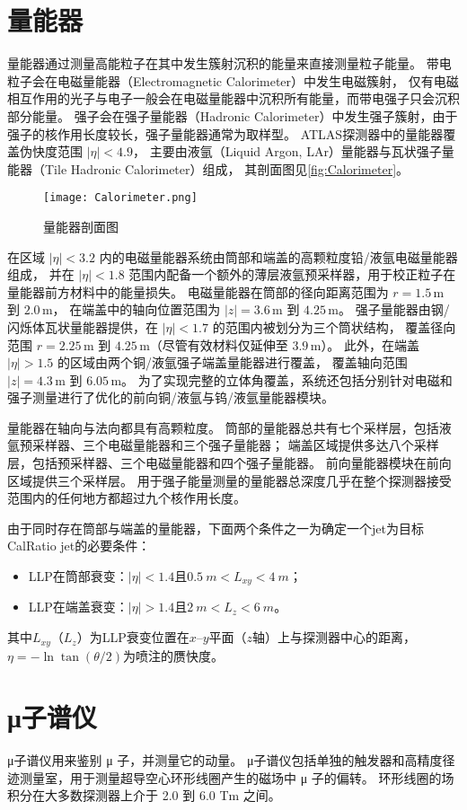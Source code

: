 \section{量能器}
量能器通过测量高能粒子在其中发生簇射沉积的能量来直接测量粒子能量。
带电粒子会在电磁量能器（Electromagnetic Calorimeter）中发生电磁簇射，
仅有电磁相互作用的光子与电子一般会在电磁量能器中沉积所有能量，而带电强子只会沉积部分能量。
强子会在强子量能器（Hadronic Calorimeter）中发生强子簇射，由于强子的核作用长度较长，强子量能器通常为取样型。
ATLAS探测器中的量能器覆盖伪快度范围 \( |\eta| < 4.9 \)，
主要由液氩（Liquid Argon, LAr）量能器与瓦状强子量能器（Tile Hadronic Calorimeter）组成，
其剖面图见\autoref{fig:Calorimeter}。

\begin{figure}[ht]
    \centering
    \texttt{[image: Calorimeter.png]}
    \caption{量能器剖面图}
    \label{fig:Calorimeter}
\end{figure}

在区域 \( |\eta| < 3.2 \) 内的电磁量能器系统由筒部和端盖的高颗粒度铅/液氩电磁量能器组成，
并在 \( |\eta| < 1.8 \) 范围内配备一个额外的薄层液氩预采样器，用于校正粒子在量能器前方材料中的能量损失。
电磁量能器在筒部的径向距离范围为 \( r = 1.5\,\text{m} \) 到 \( 2.0\,\text{m} \)，
在端盖中的轴向位置范围为 \( |z| = 3.6\,\text{m} \) 到 \( 4.25\,\text{m} \)。
强子量能器由钢/闪烁体瓦状量能器提供，在 \( |\eta| < 1.7 \) 的范围内被划分为三个筒状结构，
覆盖径向范围 \( r = 2.25\,\text{m} \) 到 \( 4.25\,\text{m} \)（尽管有效材料仅延伸至 \( 3.9\,\text{m} \)）。
此外，在端盖 \( |\eta| > 1.5 \) 的区域由两个铜/液氩强子端盖量能器进行覆盖，
覆盖轴向范围 \( |z| = 4.3\,\text{m} \) 到 \( 6.05\,\text{m} \)。
为了实现完整的立体角覆盖，系统还包括分别针对电磁和强子测量进行了优化的前向铜/液氩与钨/液氩量能器模块。

量能器在轴向与法向都具有高颗粒度。
筒部的量能器总共有七个采样层，包括液氩预采样器、三个电磁量能器和三个强子量能器；
端盖区域提供多达八个采样层，包括预采样器、三个电磁量能器和四个强子量能器。
前向量能器模块在前向区域提供三个采样层。
用于强子能量测量的量能器总深度几乎在整个探测器接受范围内的任何地方都超过九个核作用长度。

由于同时存在筒部与端盖的量能器，下面两个条件之一为确定一个jet为目标CalRatio jet的必要条件：
\begin{itemize}
    \item LLP在筒部衰变：$|\eta|<1.4$且$\SI{0.5}{m}<L_{xy}<\SI{4}{m}$；
    \item LLP在端盖衰变：$|\eta|>1.4$且$\SI{2}{m}<L_{z}<\SI{6}{m}$。
\end{itemize}
其中$L_{xy}$（$L_{z}$）为LLP衰变位置在$x$--$y$平面（$z$轴）上与探测器中心的距离，
$\eta=-\ln \tan ({\theta}/{2})$为喷注的赝快度。

\section{μ子谱仪}
μ子谱仪用来鉴别 μ 子，并测量它的动量。
μ子谱仪包括单独的触发器和高精度径迹测量室，用于测量超导空心环形线圈产生的磁场中 μ 子的偏转。
环形线圈的场积分在大多数探测器上介于 2.0 到 6.0 Tm 之间。
